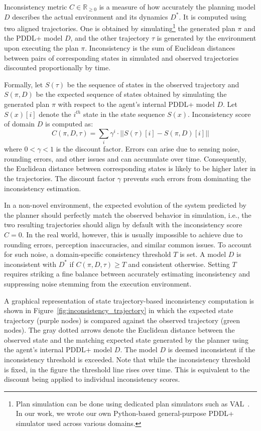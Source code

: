 \documentclass[letterpaper]{article} %
\begin{document}
Inconsistency metric $C \in \mathbb{R}_{\ge 0}$ is a measure of how accurately the planning model $D$ describes the actual environment and its dynamics $D^*$. It is computed using two aligned trajectories. One is obtained by simulating\footnote{Plan simulation can be done using dedicated plan simulators such as VAL~\cite{howey2004val}. In our work, we wrote our own Python-based general-purpose PDDL+ simulator used across various domains.} the generated plan $\pi$ and the PDDL+ model $D$, and the other trajectory $\tau$ is generated by the environment upon executing the plan $\pi$. Inconsistency is the sum of Euclidean distances between pairs of corresponding states in simulated and observed trajectories discounted proportionally by time.


Formally, let $S(\tau)$ be the sequence of states in the observed trajectory and $S(\pi,D)$ be the expected sequence of states obtained by simulating the generated plan $\pi$ with respect to the agent's internal PDDL+ model $D$. Let $S(x)[i]$ denote the $i^{th}$ state in the state sequence $S(x)$. Inconsistency score of domain $D$ is computed as:
\begin{equation}
    C(\pi, D, \tau) = \sum_{i} \gamma^i\cdot ||S(\tau)[i] - S(\pi,D)[i]||
\end{equation}
where $0<\gamma<1$ is the discount factor. Errors can arise due to sensing noise, rounding errors, and other issues and can accumulate over time. Consequently, the Euclidean distance between corresponding states is likely to be higher later in the trajectories. The discount factor $\gamma$ prevents such errors from dominating the inconsistency estimation.






In a non-novel environment, the expected evolution of the system predicted by the planner should perfectly match the observed behavior in simulation, i.e., the two resulting trajectories should align by default with the inconsistency score $C=0$. In the real world, however, this is usually impossible to achieve due to rounding errors, perception inaccuracies, and similar common issues. To account for such noise, a domain-specific consistency threshold $T$ is set. A model $D$ is inconsistent with $D^*$ if $C(\pi, D, \tau) \ge T$ and consistent otherwise. Setting $T$ requires striking a fine balance between accurately estimating inconsistency and suppressing noise stemming from the execution environment.


A graphical representation of state trajectory-based inconsistency computation is shown in Figure~\ref{fig:inconsistency_trajectory} in which the expected state trajectory (purple nodes) is compared against the observed trajectory (green nodes). The gray dotted arrows denote the Euclidean distance between the observed state and the matching expected state generated by the planner using the agent's internal PDDL+ model $D$. The model $D$ is deemed inconsistent if the inconsistency threshold is exceeded. Note that while the inconsistency threshold is fixed, in the figure the threshold line rises over time. This is equivalent to the discount being applied to individual inconsistency scores.
\end{document}
